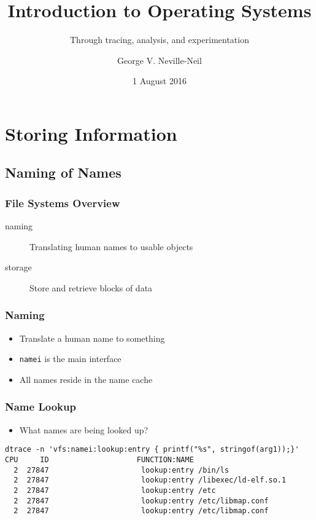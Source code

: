 \documentclass[pdftex]{beamer} %
\begin{document}

\title{Introduction to Operating Systems}
\subtitle{Through tracing, analysis, and experimentation}
\author{George V. Neville-Neil}
\date{1 August 2016}

\begin{frame}
  \titlepage
\end{frame}

\section{Storing Information}
\label{sec:storage}

\subsection{Naming of Names}
\label{sec:naming}

\begin{frame}
  \frametitle{File Systems Overview}
  \begin{description}
  \item[naming] Translating human names to usable objects
  \item[storage] Store and retrieve blocks of data
  \end{description}
\end{frame}

\begin{frame}[fragile]
  \frametitle{Naming}
  \begin{itemize}
  \item Translate a human name to something
  \item \verb+namei+ is the main interface
  \item All names reside in the name cache
  \end{itemize}
\end{frame}

\begin{frame}[fragile]
  \frametitle{Name Lookup}
  \begin{itemize}
  \item What names are being looked up?
  \end{itemize}
\begin{lstlisting}
dtrace -n 'vfs:namei:lookup:entry { printf("%s", stringof(arg1));}'
CPU     ID                    FUNCTION:NAME
  2  27847                     lookup:entry /bin/ls
  2  27847                     lookup:entry /libexec/ld-elf.so.1
  2  27847                     lookup:entry /etc
  2  27847                     lookup:entry /etc/libmap.conf
  2  27847                     lookup:entry /etc/libmap.conf
\end{lstlisting}
\end{frame}
\end{document}
